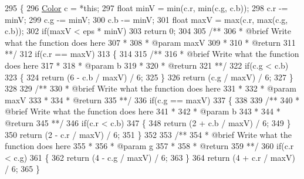 \begin{DoxyCode}
295     \{
296         \hyperlink{structColor}{Color} c = *\textcolor{keyword}{this};
297         \textcolor{keywordtype}{float} minV = min(c.r, min(c.g, c.b));
298         c.r -= minV;
299         c.g -= minV;
300         c.b -= minV;
301         \textcolor{keywordtype}{float} maxV = max(c.r, max(c.g, c.b));
302         \textcolor{keywordflow}{if}(maxV < eps * minV)
303             \textcolor{keywordflow}{return} 0;
304 \textcolor{comment}{}
305 \textcolor{comment}{        /**}
306 \textcolor{comment}{         * @brief Write what the function does here}
307 \textcolor{comment}{         *}
308 \textcolor{comment}{         * @param maxV}
309 \textcolor{comment}{         *}
310 \textcolor{comment}{         * @return}
311 \textcolor{comment}{         **/}
312         \textcolor{keywordflow}{if}(c.r == maxV)
313         \{
314 \textcolor{comment}{}
315 \textcolor{comment}{            /**}
316 \textcolor{comment}{             * @brief Write what the function does here}
317 \textcolor{comment}{             *}
318 \textcolor{comment}{             * @param b}
319 \textcolor{comment}{             *}
320 \textcolor{comment}{             * @return}
321 \textcolor{comment}{             **/}
322             \textcolor{keywordflow}{if}(c.g < c.b)
323             \{
324                 \textcolor{keywordflow}{return} (6 - c.b / maxV) / 6;
325             \}
326             \textcolor{keywordflow}{return} (c.g / maxV) / 6;
327         \}
328 \textcolor{comment}{}
329 \textcolor{comment}{        /**}
330 \textcolor{comment}{         * @brief Write what the function does here}
331 \textcolor{comment}{         *}
332 \textcolor{comment}{         * @param maxV}
333 \textcolor{comment}{         *}
334 \textcolor{comment}{         * @return}
335 \textcolor{comment}{         **/}
336         \textcolor{keywordflow}{if}(c.g == maxV)
337         \{
338 \textcolor{comment}{}
339 \textcolor{comment}{            /**}
340 \textcolor{comment}{             * @brief Write what the function does here}
341 \textcolor{comment}{             *}
342 \textcolor{comment}{             * @param b}
343 \textcolor{comment}{             *}
344 \textcolor{comment}{             * @return}
345 \textcolor{comment}{             **/}
346             \textcolor{keywordflow}{if}(c.r < c.b)
347             \{
348                 \textcolor{keywordflow}{return} (2 + c.b / maxV) / 6;
349             \}
350             \textcolor{keywordflow}{return} (2 - c.r / maxV) / 6;
351         \}
352 \textcolor{comment}{}
353 \textcolor{comment}{        /**}
354 \textcolor{comment}{         * @brief Write what the function does here}
355 \textcolor{comment}{         *}
356 \textcolor{comment}{         * @param g}
357 \textcolor{comment}{         *}
358 \textcolor{comment}{         * @return}
359 \textcolor{comment}{         **/}
360         \textcolor{keywordflow}{if}(c.r < c.g)
361         \{
362             \textcolor{keywordflow}{return} (4 - c.g / maxV) / 6;
363         \}
364         \textcolor{keywordflow}{return} (4 + c.r / maxV) / 6;
365     \}
\end{DoxyCode}
